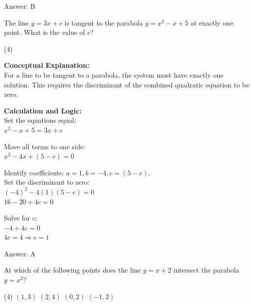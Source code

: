 \documentclass[11pt,paper=a4,answers]{exam}
\begin{document}
\begin{questions}
\begin{solution}
Answer: \colorbox{yellow!100}{B}
\end{solution}

\vspace{40pt}

\question
The line $y = 3x + c$ is tangent to the parabola $y = x^2 - x + 5$ at exactly one point. What is the value of $c$?
\begin{tasks}(4)
\end{tasks}

\begin{solution}
\textbf{Conceptual Explanation:} \\
For a line to be tangent to a parabola, the system must have exactly one solution. This requires the discriminant of the combined quadratic equation to be zero.

\vspace{20pt}

\textbf{Calculation and Logic:} \\
Set the equations equal: \\
$x^2 - x + 5 = 3x + c$

\vspace{10pt}

Move all terms to one side: \\
$x^2 - 4x + (5 - c) = 0$

\vspace{10pt}

Identify coefficients: $a = 1, b = -4, c = (5 - c)$. \\
Set the discriminant to zero: \\
$(-4)^2 - 4(1)(5 - c) = 0$ \\
$16 - 20 + 4c = 0$

\vspace{10pt}

Solve for $c$: \\
$-4 + 4c = 0$ \\
$4c = 4 \Rightarrow c = 1$

\vspace{25pt}

Answer: \colorbox{yellow!100}{A}
\end{solution}

\vspace{40pt}

\question
At which of the following points does the line $y = x + 2$ intersect the parabola $y = x^2$?
\begin{tasks}(4)
    \task $(1, 3)$
    \task $(2, 4)$
    \task $(0, 2)$
    \task $(-1, 2)$
\end{tasks}


\end{questions}
\end{document}
